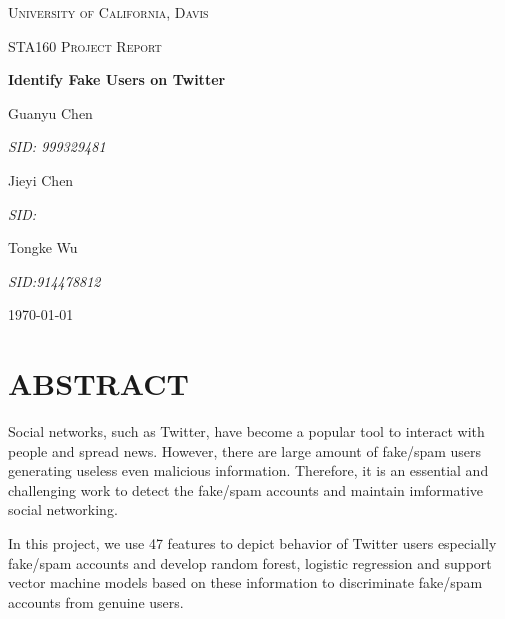 \documentclass[a4paper, 12pt]{report}
\begin{document}
\begin{titlepage}
	\centering
	{\scshape\LARGE University of California, Davis \par}
	{\scshape\Large STA160 Project Report\par}
	\vspace{5cm}
	
	
	{\huge\bfseries Identify Fake Users on Twitter \par}
	\vspace{3cm}
	
	{\Large Guanyu Chen \par}
	{\large\itshape SID: 999329481 \par}
	
	{\Large Jieyi Chen \par}
	{\large\itshape SID: \par}

	{\Large Tongke Wu\par}
	{\large\itshape SID:914478812 \par}
		\vfill
	{\large \today\par}
\end{titlepage}

\section*{ABSTRACT}
Social networks, such as Twitter, have become a popular tool to interact with people and spread news. However, there are large amount of fake/spam users generating useless even malicious information. Therefore, it is an essential and challenging work to detect the fake/spam accounts and maintain imformative social networking. \par

\noindent In this project, we use 47 features to depict behavior of Twitter users especially fake/spam accounts and develop random forest, logistic regression and support vector machine models based on these information to discriminate fake/spam accounts from genuine users. 
\end{document}
